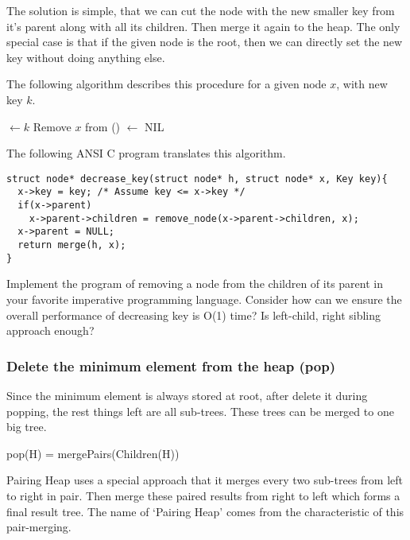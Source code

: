 \documentclass{article}
\begin{document}
The solution is simple, that we can cut the node with the new smaller
key from it's parent along with all its children. Then merge it again
to the heap. The only special case is that if the given node is the 
root, then we can directly set the new key without doing anything else.

The following algorithm describes this procedure for a given node $x$, with
new key $k$.

\begin{algorithmic}[1]
  \State {} $\gets k$
    \State Remove $x$ from ()
  \EndIf
   $\gets$ NIL
  \State \Return {}
\EndFunction
\end{algorithmic}

The following ANSI C program translates this algorithm.

\lstset{language=C}
\begin{lstlisting}
struct node* decrease_key(struct node* h, struct node* x, Key key){
  x->key = key; /* Assume key <= x->key */
  if(x->parent)
    x->parent->children = remove_node(x->parent->children, x);
  x->parent = NULL;
  return merge(h, x);
}
\end{lstlisting}

\begin{Exercise}
Implement the program of removing a node from the children of its
parent in your favorite imperative programming language. Consider
how can we ensure the overall performance of decreasing key is 
O(1) time? Is left-child, right sibling approach enough?
\end{Exercise}

\subsubsection{Delete the minimum element from the heap (pop)}
 
Since the minimum element is always stored at root, after delete it
during popping, the rest things left are all sub-trees. These trees
can be merged to one big tree. 

\be
  pop(H) = mergePairs(Children(H))
\ee

Pairing Heap uses a special approach that it merges every two sub-trees 
from left to right in pair. Then
merge these paired results from right to left which forms a final
result tree. The name of `Pairing Heap' comes from the characteristic 
of this pair-merging.
\end{document}
